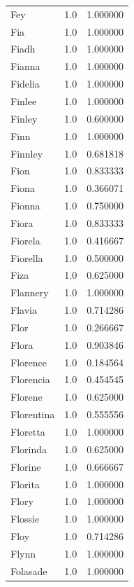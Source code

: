 \documentclass[
  letterpaper,
  DIV=11,
  numbers=noendperiod]{scrreprt}
\begin{document}
\begin{tabular}{lrr}
Fey             &   1.0 &   1.000000 \\
Fia             &   1.0 &   1.000000 \\
Fiadh           &   1.0 &   1.000000 \\
Fianna          &   1.0 &   1.000000 \\
Fidelia         &   1.0 &   1.000000 \\
Finlee          &   1.0 &   1.000000 \\
Finley          &   1.0 &   0.600000 \\
Finn            &   1.0 &   1.000000 \\
Finnley         &   1.0 &   0.681818 \\
Fion            &   1.0 &   0.833333 \\
Fiona           &   1.0 &   0.366071 \\
Fionna          &   1.0 &   0.750000 \\
Fiora           &   1.0 &   0.833333 \\
Fiorela         &   1.0 &   0.416667 \\
Fiorella        &   1.0 &   0.500000 \\
Fiza            &   1.0 &   0.625000 \\
Flannery        &   1.0 &   1.000000 \\
Flavia          &   1.0 &   0.714286 \\
Flor            &   1.0 &   0.266667 \\
Flora           &   1.0 &   0.903846 \\
Florence        &   1.0 &   0.184564 \\
Florencia       &   1.0 &   0.454545 \\
Florene         &   1.0 &   0.625000 \\
Florentina      &   1.0 &   0.555556 \\
Floretta        &   1.0 &   1.000000 \\
Florinda        &   1.0 &   0.625000 \\
Florine         &   1.0 &   0.666667 \\
Florita         &   1.0 &   1.000000 \\
Flory           &   1.0 &   1.000000 \\
Flossie         &   1.0 &   1.000000 \\
Floy            &   1.0 &   0.714286 \\
Flynn           &   1.0 &   1.000000 \\
Folasade        &   1.0 &   1.000000 \\

\end{tabular}
\end{document}
